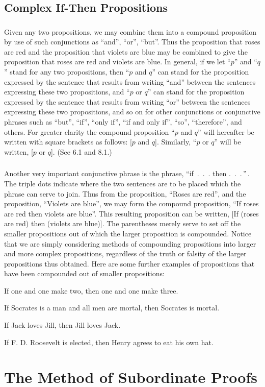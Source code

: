 \documentclass{book}
\begin{document}
\section{Complex If-Then Propositions}
\label{sec:3}

\subsection{}
\label{sec:3.1}

Given any two propositions, we may combine them into a compound proposition by use of such conjunctions as “and”, “or”, “but”.  Thus the proposition that roses are red and the proposition that violets are blue may be combined to give the proposition that roses are red and violets are blue.  In general, if we let “\(p\)” and “\(q\)” stand for any two propositions, then “\(p\) and \(q\)” can stand for the proposition expressed by the sentence that results from writing “and” between the sentences expressing these two propositions, and “\(p\) or \(q\)” can stand for the proposition expressed by the sentence that results from writing “or” between the sentences expressing these two propositions, and so on for other conjunctions or conjunctive phrases such as “but”, “if”, “only if”, “if and only if”, “so”, “therefore”, and others.  For greater clarity the compound proposition “\(p\) and \(q\)” will hereafter be written with square brackets as follows: [\(p\) and \(q\)].  Similarly, “\(p\) or \(q\)” will be written, [\(p\) or \(q\)].  (See 6.1 and 8.1.)

\subsection{}
\label{sec:3.2}

Another very important conjunctive phrase is the phrase, “if~.~.~. then .~.~.\,”\,.  The triple dots indicate where the two sentences are to be placed which the phrase can serve to join.  Thus from the proposition, “Roses are red”, and the proposition, “Violets are blue”, we may form the compound proposition, “If roses are red then violets are blue”.  This resulting proposition can be written, [If (roses are red) then (violets are blue)].  The parentheses merely serve to set off the smaller propositions out of which the larger proposition is compounded.  Notice that we are simply considering methods of compounding propositions into larger and more complex propositions, regardless of the truth or falsity of the larger propositions thus obtained.  Here are some further examples of propositions that have been compounded out of smaller propositions:
\begin{description}[left=2\parindent,itemindent=-\parindent,labelsep=0pt, nosep,topsep=3pt]
\item If one and one make two, then one and one make three.
\item If Socrates is a man and all men are mortal, then Socrates is mortal.
\item If Jack loves Jill, then Jill loves Jack.
\item If F. D. Roosevelt is elected, then Henry agrees to eat his own hat.
\end{description}

\chapter{The Method of Subordinate Proofs}
\label{chap:2}
\end{document}
